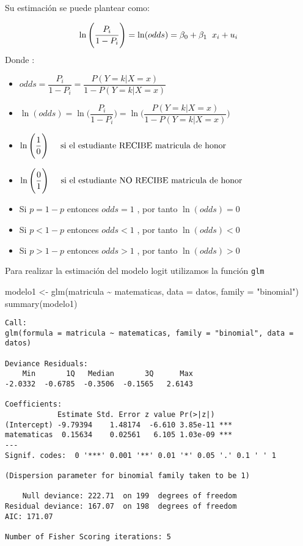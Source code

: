 \documentclass[
]{article}
\newenvironment{Shaded}{\begin{snugshade}}{\end{snugshade}}
\newcommand{\AttributeTok}[1]{\textcolor[rgb]{0.77,0.63,0.00}{#1}}
\newcommand{\FunctionTok}[1]{\textcolor[rgb]{0.00,0.00,0.00}{#1}}
\newcommand{\NormalTok}[1]{#1}
\newcommand{\OtherTok}[1]{\textcolor[rgb]{0.56,0.35,0.01}{#1}}
\newcommand{\SpecialCharTok}[1]{\textcolor[rgb]{0.00,0.00,0.00}{#1}}
\newcommand{\StringTok}[1]{\textcolor[rgb]{0.31,0.60,0.02}{#1}}
\begin{document}
Su estimación se puede plantear como:

\[\ln \Bigg(\dfrac{P_{i}}{1-P_{i}} \Bigg) = \ln (odds) =\beta_{0} + \beta_{1} \hspace{.2cm}x_{i} + u_{i}\]
Donde :

\begin{itemize}
\item
  \(odds = \dfrac{P_{i}}{1-P_{i}} = \dfrac{P(Y=k|X=x)}{1-P(Y=k|X=x)}\)
\item
  \(\ln(odds) = \ln \Bigg(\dfrac{P_{i}}{1-P_{i}} \Bigg) = \ln \Bigg(\dfrac{P(Y=k|X=x)}{1-P(Y=k|X=x)}\Bigg)\)
\item
  \(\ln \Bigg(\dfrac{1}{0}\Bigg) \hspace{.5cm}\text{si el estudiante RECIBE matricula de honor}\)
\item
  \(\ln \Bigg(\dfrac{0}{1}\Bigg) \hspace{.5cm}\text{si el estudiante NO RECIBE matricula de honor}\)
\item
  Si \(p = 1-p\) entonces \(odds = 1\) , por tanto \(\ln(odds) = 0\)
\item
  Si \(p < 1-p\) entonces \(odds < 1\) , por tanto \(\ln(odds) < 0\)
\item
  Si \(p > 1-p\) entonces \(odds > 1\) , por tanto \(\ln(odds) > 0\)
\end{itemize}

Para realizar la estimación del modelo logit utilizamos la función
\texttt{glm}

\begin{Shaded}
\begin{Highlighting}[]
\NormalTok{modelo1 }\OtherTok{\textless{}{-}} \FunctionTok{glm}\NormalTok{(matricula }\SpecialCharTok{\textasciitilde{}}\NormalTok{ matematicas, }\AttributeTok{data =}\NormalTok{ datos, }\AttributeTok{family =} \StringTok{"binomial"}\NormalTok{)}
\FunctionTok{summary}\NormalTok{(modelo1)}
\end{Highlighting}
\end{Shaded}

\begin{verbatim}
Call:
glm(formula = matricula ~ matematicas, family = "binomial", data = datos)

Deviance Residuals: 
    Min       1Q   Median       3Q      Max  
-2.0332  -0.6785  -0.3506  -0.1565   2.6143  

Coefficients:
            Estimate Std. Error z value Pr(>|z|)    
(Intercept) -9.79394    1.48174  -6.610 3.85e-11 ***
matematicas  0.15634    0.02561   6.105 1.03e-09 ***
---
Signif. codes:  0 '***' 0.001 '**' 0.01 '*' 0.05 '.' 0.1 ' ' 1

(Dispersion parameter for binomial family taken to be 1)

    Null deviance: 222.71  on 199  degrees of freedom
Residual deviance: 167.07  on 198  degrees of freedom
AIC: 171.07

Number of Fisher Scoring iterations: 5
\end{verbatim}
\end{document}
